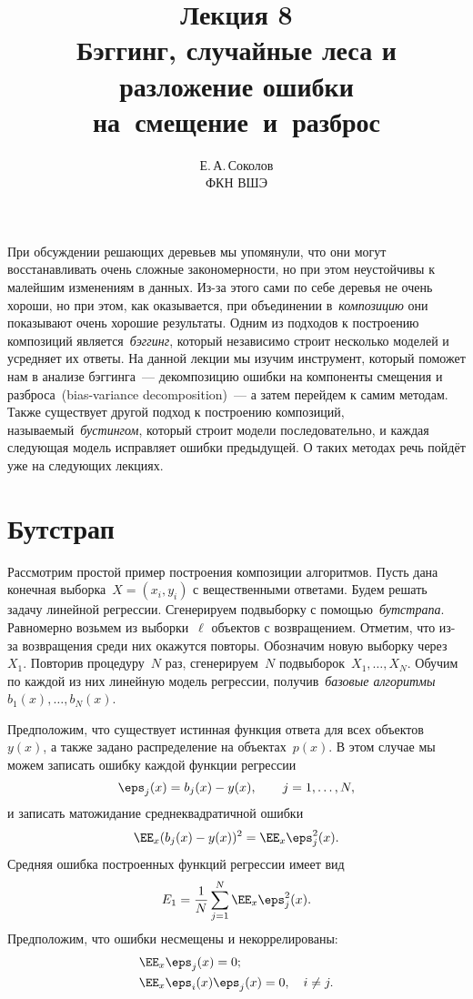 \documentclass[12pt,fleqn]{article}
\begin{document}
\title{Лекция 8\\Бэггинг, случайные леса и разложение ошибки на~смещение~и~разброс}
\author{Е.\,А.\,Соколов\\ФКН ВШЭ}
\maketitle

При обсуждении решающих деревьев мы упомянули, что они могут
восстанавливать очень сложные закономерности,
но при этом неустойчивы к малейшим изменениям в данных.
Из-за этого сами по себе деревья не очень хороши,
но при этом, как оказывается, при объединении в~\emph{композицию}
они показывают очень хорошие результаты.
Одним из подходов к построению композиций является~\emph{бэггинг},
который независимо строит несколько моделей и усредняет их ответы.
На данной лекции мы изучим инструмент, который поможет нам в анализе бэггинга~---
декомпозицию ошибки на компоненты смещения и разброса~(bias-variance decomposition)~---
а затем перейдем к самим методам.
Также существует другой подход к построению композиций, называемый~\emph{бустингом},
который строит модели последовательно, и каждая следующая модель исправляет ошибки предыдущей.
О таких методах речь пойдёт уже на следующих лекциях.

\section{Бутстрап}
Рассмотрим простой пример построения композиции алгоритмов.
Пусть дана конечная выборка~$X = (x_i, y_i)$ с вещественными ответами.
Будем решать задачу линейной регрессии.
Сгенерируем подвыборку с помощью~\emph{бутстрапа}.
Равномерно возьмем из выборки~$\ell$ объектов с возвращением.
Отметим, что из-за возвращения среди них окажутся повторы.
Обозначим новую выборку через~$X_1$.
Повторив процедуру~$N$ раз, сгенерируем~$N$ подвыборок~$X_1, \dots, X_N$.
Обучим по каждой из них линейную модель регрессии,
получив~\emph{базовые алгоритмы}~$b_1(x), \dots, b_N(x)$.

Предположим, что существует истинная функция ответа для всех объектов~$y(x)$,
а также задано распределение на объектах~$p(x)$.
В этом случае мы можем записать ошибку каждой функции регрессии
\[
    \eps_j(x) = b_j(x) - y(x),
    \qquad
    j = 1, \dots, N,
\]
и записать матожидание среднеквадратичной ошибки
\[
    \EE_x (b_j(x) - y(x))^2
    =
    \EE_x \eps_j^2(x).
\]
Средняя ошибка построенных функций регрессии имеет вид
\[
    E_1
    =
    \frac{1}{N}
    \sum_{j = 1}^{N}
    \EE_x \eps_j^2(x).
\]
Предположим, что ошибки несмещены и некоррелированы:
\begin{align*}
    &\EE_x \eps_j(x) = 0;\\
    &\EE_x \eps_i(x) \eps_j(x) = 0,
    \quad
    i \neq j.
\end{align*}
\end{document}
